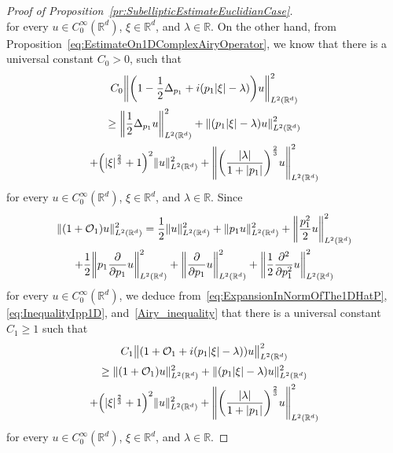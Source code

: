 \documentclass[10pt]{amsart}
\theoremstyle{definition}\newtheorem{defi}[theo]{Definition}\newtheorem{rema}[theo]{Remark}\newtheorem{exam}[theo]{Example}\newtheorem{exem}[theo]{Example}\newtheorem{nota}[theo]{Notation}
\newcommand{\R}{\mathbb{R}}
\newcommand{\clO}{\mathcal{O}}
\newcommand{\p}{\partial}
\let\originalleft\left
\let\originalright\right
\renewcommand{\left}{\mathopen{}\mathclose\bgroup\originalleft}
\renewcommand{\right}{\aftergroup\egroup\originalright}
\begin{document}
\begin{proof}[{Proof of Proposition~\ref{pr:SubellipticEstimateEuclidianCase}}]
\begin{equation}
\end{equation}
for every $u \in C^\infty_0(\R^d)$, $\xi \in \R^d$, and $\lambda \in \R$. On the other hand, from Proposition~\ref{eq:EstimateOn1DComplexAiryOperator}, we know that there is a universal constant $C_0>0$, such that
\begin{multline}\label{Airy_inequality}
C_0 \left\|\left(1 - \frac{1}{2} \Delta_{p_1} + i(p_1 |\xi|-\lambda)\right) u \right\|^2_{L^2(\R^d)}\\
\geq \left\| \frac{1}{2} \Delta_{p_1} u \right\|^2_{L^2(\R^d)} + \left\| (p_1 |\xi| -\lambda) u \right\|^2_{L^2(\R^d)}\\
+ \left(|\xi|^{\frac{2}{3}}+1\right)^2 \|u\|^2_{L^2(\R^d)} + \left\|\left(\frac{|\lambda|}{1+|p_1|}\right)^{\frac{2}{3}}u\right\|^2_{L^2(\R^d)}
\end{multline}
for every $u \in C^\infty_0(\R^d)$, $\xi \in \R^d$, and $\lambda \in \R$. Since
\begin{multline*}
\|(1+\clO_1)u \|_{L^2(\R^d)}^2 = \frac{1}{2} \|u\|^2_{L^2(\R^d)} + \| p_1 u\|^2_{L^2(\R^d)}+ \left\|\frac{p_1^2}{2} u \right\|^2_{L^2(\R^d)}\\
+ \frac{1}{2}\left\|p_1 \frac{\partial}{\partial p_1} u \right\|^2_{L^2(\R^d)} + \left\|\frac{\partial}{ \partial p_1} u \right\|^2_{L^2(\R^d)} + \left\| \frac{1}{2} \frac{\p^2}{\p p_1^2} u\right\|^2_{L^2(\R^d)}
\end{multline*}
for every $u \in C^\infty_0(\R^d)$, we deduce from~\eqref{eq:ExpansionInNormOfThe1DHatP}, \eqref{eq:InequalityIpp1D}, and~\eqref{Airy_inequality} that there is a universal constant $C_1\geq 1$ such that
\begin{multline}\label{lower_bound_for_O1}
C_1\bigl\| (1+\clO_1+i(p_{1}|\xi|-\lambda)) u \bigr\|^{2}_{L^2(\R^d)}\\
\geq \| (1+\clO_{1})u\|^{2}_{L^2(\R^d)}+\|(p_{1}|\xi| - \lambda)u\|^{2}_{L^2(\R^d)}
\\
+ \left(|\xi|^{\frac{2}{3}}+1\right)^{2} \| u \|^{2}_{L^2(\R^d)}+
\left\|
\left(
\frac{|\lambda|}{1+|p_{1}|}
\right)^{\frac{2}{3}}u
\right\|^{2}_{L^2(\R^d)}
\end{multline}
for every $u \in C^\infty_0(\R^d)$, $\xi \in \R^d$, and $\lambda \in \R$.


\end{proof}
\end{document}

